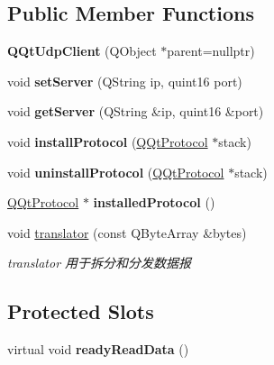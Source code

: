 \subsection*{Public Member Functions}
\begin{DoxyCompactItemize}
\item 
\mbox{\label{class_q_qt_udp_client_aff5e16f419b2e67808c9ca3bbd8bcfdd}} 
{\bfseries Q\+Qt\+Udp\+Client} (Q\+Object $\ast$parent=nullptr)
\item 
\mbox{\label{class_q_qt_udp_client_a0f1de4bf70fe6b3487272a75436e280f}} 
void {\bfseries set\+Server} (Q\+String ip, quint16 port)
\item 
\mbox{\label{class_q_qt_udp_client_af4aa6039dab0f21cc788b0003e049185}} 
void {\bfseries get\+Server} (Q\+String \&ip, quint16 \&port)
\item 
\mbox{\label{class_q_qt_udp_client_aab21d0827990f8f29ed23f588b825b9e}} 
void {\bfseries install\+Protocol} (\mbox{\hyperlink{class_q_qt_protocol}{Q\+Qt\+Protocol}} $\ast$stack)
\item 
\mbox{\label{class_q_qt_udp_client_a014d30f02a0c6c086351fc237f6c299b}} 
void {\bfseries uninstall\+Protocol} (\mbox{\hyperlink{class_q_qt_protocol}{Q\+Qt\+Protocol}} $\ast$stack)
\item 
\mbox{\label{class_q_qt_udp_client_a127b5f524ade2841a653add755ac77e9}} 
\mbox{\hyperlink{class_q_qt_protocol}{Q\+Qt\+Protocol}} $\ast$ {\bfseries installed\+Protocol} ()
\item 
void \mbox{\hyperlink{class_q_qt_udp_client_a231ee307f41a4a32f8709fdb9ec9bb55}{translator}} (const Q\+Byte\+Array \&bytes)
\begin{DoxyCompactList}\small\item\em translator 用于拆分和分发数据报 \end{DoxyCompactList}\end{DoxyCompactItemize}
\subsection*{Protected Slots}
\begin{DoxyCompactItemize}
\item 
\mbox{\label{class_q_qt_udp_client_aa6b61458170cf9626524ca44fba2b01b}} 
virtual void {\bfseries ready\+Read\+Data} ()
\end{DoxyCompactItemize}
